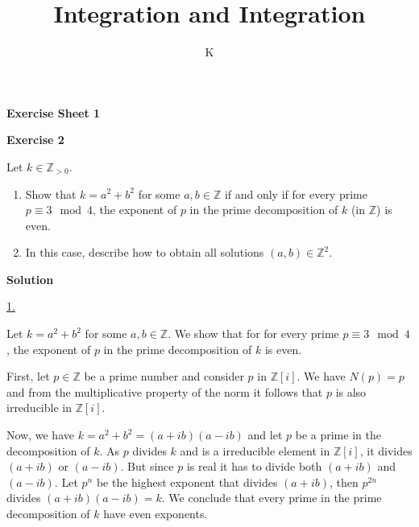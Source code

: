 \documentclass[a4paper]{article}
\title{Integration and Integration}
\author{K}
\theoremstyle{definition}
\begin{document}
\begin{center}
    \noindent\textbf{Exercise Sheet 1}
\end{center}
\noindent\textbf{Exercise 2}

Let \(k \in \mathbb{Z}_{>0}\).
\begin{enumerate}
    \item Show that \(k = a^2 + b^2\) for some \(a, b \in \mathbb{Z}\) if and only if for every prime \(p \equiv 3 \mod 4\), the exponent of \(p\) in the prime decomposition of \(k\) (in \(\mathbb{Z}\)) is even.
    \item In this case, describe how to obtain all solutions \((a, b) \in \mathbb{Z}^2\).
\end{enumerate}

\noindent\textbf{Solution}

\noindent\underline{1.}

\noindent Let \(k = a^2 + b^2\) for some \(a, b \in \mathbb{Z}\). We show that for for every prime \(p \equiv 3 \mod 4\), the exponent of \(p\) in the prime decomposition of \(k\) is even.

First, let \(p \in \mathbb{Z}\) be a prime number and consider \(p\) in \(\mathbb{Z}[i]\). We have \(N(p) = p\) and from the multiplicative property of the norm it follows that \(p\) is also irreducible in \(\mathbb{Z}[i]\).

Now, we have \(k = a^2 + b^2 = (a + ib)(a - ib)\) and let \(p\) be a prime in the decomposition of \(k\). As \(p\) divides \(k\) and is a irreducible element in \(\mathbb{Z}[i]\), it divides \((a + ib)\) or \((a - ib)\). But since \(p\) is real it has to divide both \((a + ib)\) and \((a - ib)\). Let \(p^n\) be the highest exponent that divides \((a + ib)\), then \(p^{2n}\) divides \((a + ib)(a - ib) = k\). We conclude that every prime in the prime decomposition of \(k\) have even exponents.
\end{document}
